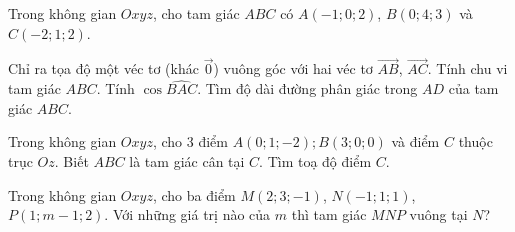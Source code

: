 \begin{vd}
	Trong không gian $Oxyz$, cho tam giác $ABC$ có $A(-1; 0; 2)$, $B(0; 4; 3)$ và $C(-2; 1; 2)$. 
	\begin{tasks}
		\task Chỉ ra tọa độ một véc tơ (khác $\vec{0}$) vuông góc với hai véc tơ $\vec{AB}$, $\vec{AC}$.
		\task Tính chu vi tam giác $ABC$.
		\task Tính $\cos \widehat{BAC}$.
		\task Tìm độ dài đường phân giác trong $AD$ của tam giác $ABC$.
	\end{tasks}
\end{vd}
\begin{vd}
	Trong không gian $Oxyz$, cho 3 điểm $A\left(0;1;-2\right);B\left(3;0;0\right)$ và điểm $C$ thuộc trục $Oz$. Biết $ABC$ là tam giác cân tại $C$. Tìm toạ độ điểm $C$.
	
\end{vd}
\begin{vd}
	Trong không gian $Oxyz$, cho ba điểm $M\left(2;3;-1\right)$, $N\left(-1;1;1\right)$, $P\left(1;m-1;2\right)$. Với những giá trị nào của $m$ thì tam giác $MNP$ vuông tại $N$?
\end{vd}
